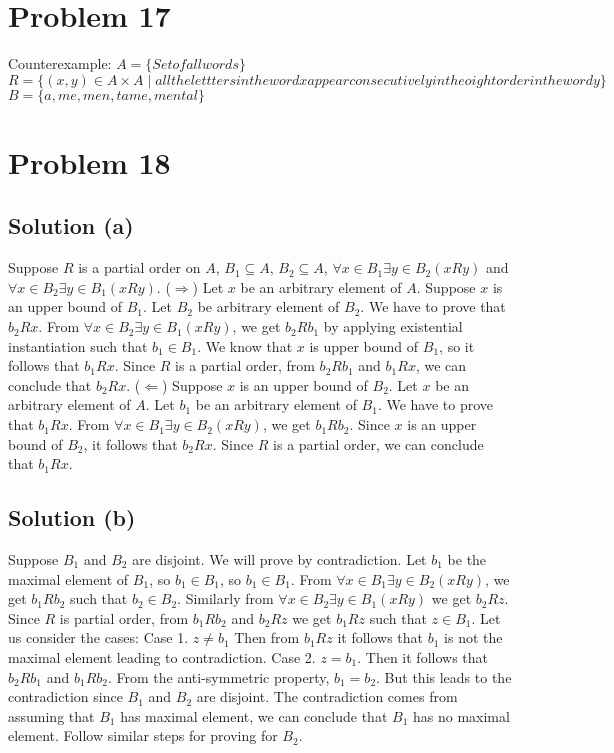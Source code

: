 \documentclass{article}
\begin{document}
\section{Problem 17}
Counterexample:
$A = \{Set of all words\}$ \\
$R = \{(x,y) \in A \times A \mid all the lettters in the word x appear
consecutively in the oight order in the word y\}$ \\
$B = \{a, me, men, tame, mental\}$

\section{Problem 18}
\subsection{Solution (a)}
Suppose $R$ is a partial order on $A$, $B_1 \subseteq A$, $B_2
\subseteq A$, $\forall x \in B_1 \exists y \in B_2(xRy)$ and $\forall
x \in B_2 \exists y \in B_1 (xRy)$.
($\Rightarrow$) Let $x$ be an arbitrary element of $A$. Suppose $x$ is an
upper bound of $B_1$. Let $B_2$ be arbitrary element of $B_2$. We have
to prove that $b_2Rx$. From $\forall x \in B_2 \exists y \in B_1
(xRy)$, we get $b_2Rb_1$ by applying existential instantiation such
that $b_1 \in B_1$. We know that $x$ is upper bound of $B_1$, so it
follows that $b_1Rx$. Since $R$ is a partial order, from $b_2Rb_1$ and
$b_1Rx$, we can conclude that $b_2Rx$.
($\Leftarrow$) Suppose $x$ is an upper bound of $B_2$. Let $x$ be an
arbitrary element of $A$. Let $b_1$ be an arbitrary element of $B_1$.
We have to prove that $b_1Rx$. From $\forall x \in B_1 \exists y \in
B_2 (xRy)$, we get $b_1Rb_2$. Since $x$ is an upper bound of $B_2$, it
follows that $b_2Rx$. Since $R$ is a partial order, we can conclude
that $b_1Rx$.
\subsection{Solution (b)}
Suppose $B_1$ and $B_2$ are disjoint. We will prove by contradiction.
Let $b_1$ be the maximal element of $B_1$, so $b_1 \in B_1$, so $b_1
\in B_1$. From $\forall x \in B_1 \exists y \in B_2 (xRy)$, we get
$b_1Rb_2$ such that $b_2 \in B_2$. Similarly from $\forall x \in B_2
\exists y \in B_1(xRy)$ we get $b_2Rz$. Since $R$ is partial order,
from $b_1Rb_2$ and $b_2Rz$ we get $b_1Rz$ such that $z \in B_1$. Let
us consider the cases:
Case 1. $z \neq b_1$ Then from $b_1Rz$ it follows that $b_1$ is not
the maximal element leading to contradiction.
Case 2. $z = b_1$. Then it follows that $b_2Rb_1$ and $b_1Rb_2$. From
the anti-symmetric property, $b_1 = b_2$. But this leads to the
contradiction since $B_1$ and $B_2$ are disjoint.
The contradiction comes from assuming that $B_1$ has maximal element,
we can conclude that $B_1$ has no maximal element.
Follow similar steps for proving for $B_2$.
\end{document}
